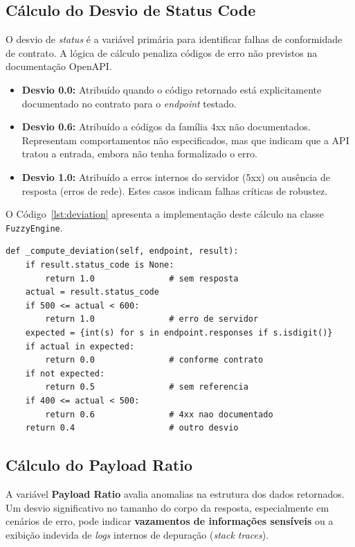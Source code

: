 \subsection{Cálculo do Desvio de Status Code}

O desvio de \textit{status} é a variável primária para identificar falhas de conformidade de contrato. A lógica de cálculo penaliza códigos de erro não previstos na documentação OpenAPI.

\begin{itemize}
    \item \textbf{Desvio 0.0:} Atribuído quando o código retornado está explicitamente documentado no contrato para o \textit{endpoint} testado.
    \item \textbf{Desvio 0.6:} Atribuído a códigos da família 4xx não documentados. Representam comportamentos não especificados, mas que indicam que a API tratou a entrada, embora não tenha formalizado o erro.
    \item \textbf{Desvio 1.0:} Atribuído a erros internos do servidor (5xx) ou ausência de resposta (erros de rede). Estes casos indicam falhas críticas de robustez.
\end{itemize}

O Código~\ref{lst:deviation} apresenta a implementação deste cálculo na classe \texttt{FuzzyEngine}.

\begin{lstlisting}[caption=Cálculo do desvio de \textit{status} (\texttt{fuzzy\_engine.py}), label=lst:deviation]
def _compute_deviation(self, endpoint, result):
    if result.status_code is None:
        return 1.0               # sem resposta
    actual = result.status_code
    if 500 <= actual < 600:
        return 1.0               # erro de servidor
    expected = {int(s) for s in endpoint.responses if s.isdigit()}
    if actual in expected:
        return 0.0               # conforme contrato
    if not expected:
        return 0.5               # sem referencia
    if 400 <= actual < 500:
        return 0.6               # 4xx nao documentado
    return 0.4                   # outro desvio
\end{lstlisting}

\subsection{Cálculo do Payload Ratio}

A variável \textbf{Payload Ratio} avalia anomalias na estrutura dos dados retornados. Um desvio significativo no tamanho do corpo da resposta, especialmente em cenários de erro, pode indicar \textbf{vazamentos de informações sensíveis} ou a exibição indevida de \textit{logs} internos de depuração (\textit{stack traces}).

